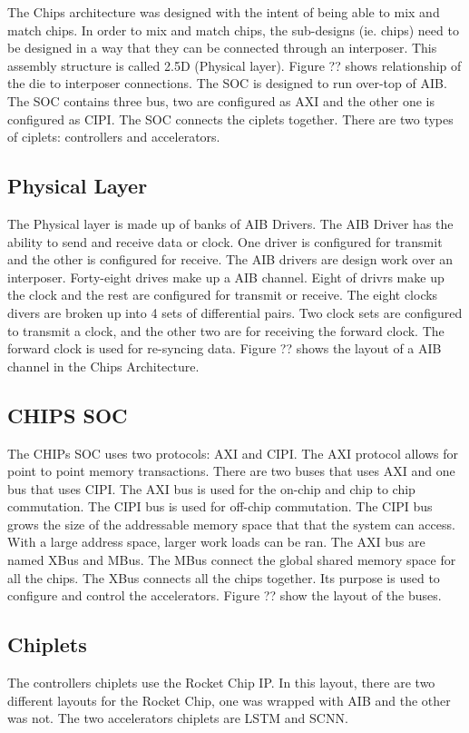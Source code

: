 \documentclass[../main.tex]{subfiles}
\begin{document}
The Chips architecture was designed with the intent of being able to mix and match chips. In order to mix and match chips, the sub-designs (ie. chips) need to be designed in a way that they can be connected through an interposer. This assembly structure is called 2.5D (Physical layer). Figure ?? shows relationship of the die to interposer connections. The SOC is designed to run over-top of AIB. The SOC contains three bus, two are configured as AXI and the other one is configured as CIPI. The SOC connects the ciplets together. There are two types of ciplets: controllers and accelerators.

\subsection{Physical Layer}
The Physical layer is made up of banks of AIB Drivers. The AIB Driver has the ability to send and receive data or clock. One driver is configured for transmit and the other is configured for receive. The AIB drivers are design work over an interposer. Forty-eight drives make up a AIB channel. Eight of drivrs make up the clock and the rest are configured for transmit or receive. The eight clocks divers are broken up into 4 sets of differential pairs. Two clock sets are configured to transmit a clock, and the other two are for receiving the forward clock. The forward clock is used for re-syncing data. Figure ?? shows the layout of a AIB channel in the Chips Architecture.

\subsection{CHIPS SOC}
The CHIPs SOC uses two protocols: AXI and CIPI. The AXI protocol allows for point to point memory transactions. There are two buses that uses AXI and one bus that uses CIPI. The AXI bus is used for the on-chip and chip to chip commutation. The CIPI bus is used for off-chip commutation. The CIPI bus grows the size of the addressable memory space that that the system can access. With a large address space, larger work loads can be ran. The AXI bus are named XBus and MBus. The MBus connect the global shared memory space for all the chips. The XBus connects all the chips together. Its purpose is used to configure and control the accelerators. Figure ?? show the layout of the buses.

\subsection{Chiplets}
The controllers chiplets use the Rocket Chip IP\cite{Asanović:EECS-2016-17}. In this layout, there are two different layouts for the Rocket Chip, one was wrapped with AIB and the other was not. The two accelerators chiplets are LSTM and SCNN.
\end{document}
